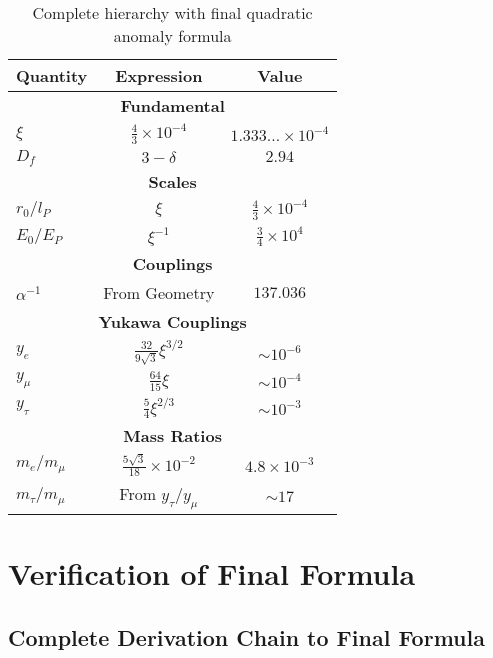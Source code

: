 \documentclass[12pt,a4paper]{article}
\newcommand{\lP}{l_P}
\newcommand{\EP}{E_P}
\newcommand{\rzero}{r_0}
\newcommand{\Ezero}{E_0}
\newcommand{\xipar}{\xi}
\begin{document}
	\begin{table}[h]
		\centering
		\begin{tabular}{lcc}
			\toprule
			\textbf{Quantity} & \textbf{Expression} & \textbf{Value} \\
			\midrule
			\multicolumn{3}{c}{\textbf{Fundamental}} \\
			$\xipar$ & $\frac{4}{3} \times 10^{-4}$ & $1.333\ldots \times 10^{-4}$ \\
			$D_f$ & $3 - \delta$ & $2.94$ \\
			\midrule
			\multicolumn{3}{c}{\textbf{Scales}} \\
			$\rzero/\lP$ & $\xipar$ & $\frac{4}{3} \times 10^{-4}$ \\
			$\Ezero/\EP$ & $\xipar^{-1}$ & $\frac{3}{4} \times 10^{4}$ \\
			\midrule
			\multicolumn{3}{c}{\textbf{Couplings}} \\
			$\alpha^{-1}$ & From Geometry & $137.036$ \\
			\midrule
			\multicolumn{3}{c}{\textbf{Yukawa Couplings}} \\
			$y_e$ & $\frac{32}{9\sqrt{3}} \xipar^{3/2}$ & $\sim 10^{-6}$ \\
			$y_\mu$ & $\frac{64}{15} \xipar$ & $\sim 10^{-4}$ \\
			$y_\tau$ & $\frac{5}{4} \xipar^{2/3}$ & $\sim 10^{-3}$ \\
			\midrule
			\multicolumn{3}{c}{\textbf{Mass Ratios}} \\
			$m_e/m_\mu$ & $\frac{5 \sqrt{3}}{18} \times 10^{-2}$ & $4.8 \times 10^{-3}$ \\
			$m_\tau/m_\mu$ & From $y_\tau/y_\mu$ & $\sim 17$ \\
			\midrule

		\end{tabular}
		\caption{Complete hierarchy with final quadratic anomaly formula}
	\end{table}
	
	\section{Verification of Final Formula}
	
	\subsection{Complete Derivation Chain to Final Formula}
	
\end{document}
